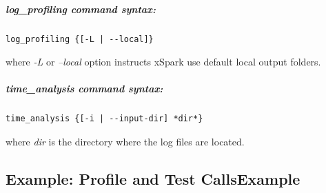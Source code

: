 %

\hypertarget{log_profiling-command-syntax}{%
\subparagraph{\texorpdfstring{\emph{log\_profiling} command
		syntax:}{log\_profiling command syntax:}}\label{log_profiling-command-syntax}}

\begin{verbatim}
log_profiling {[-L | --local]}
\end{verbatim}

where \emph{-L} or \emph{--local} option instructs xSpark use default
local output folders.

\hypertarget{time_analysis-command-syntax}{%
\subparagraph{\texorpdfstring{\emph{time\_analysis} command
		syntax:}{time\_analysis command syntax:}}\label{time_analysis-command-syntax}}

\begin{verbatim}
time_analysis {[-i | --input-dir] *dir*}
\end{verbatim}

where \emph{dir} is the directory where the log files are located.

\hypertarget{example-profile-and-test-callsexample}{%
\subsection{Example: Profile and Test
	CallsExample}\label{example-profile-and-test-callsexample}}


